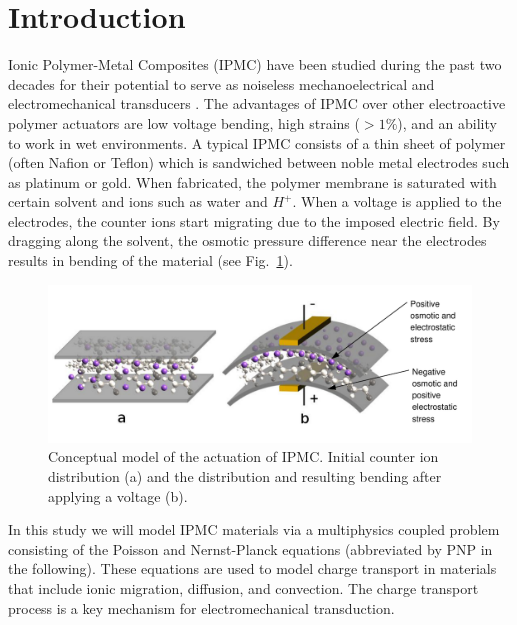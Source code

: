 \section{Introduction}

Ionic Polymer-Metal Composites (IPMC) have been studied during the past two 
decades for their potential to serve as noiseless mechanoelectrical and electromechanical 
transducers \cite{basu1997membrane,shahinpoor2001smartmat,
nasser2002applied,newbury2003intelligent, wallmersperger2007appliedphysics,
pugal2008appliedphysics,pugal2010polymer}.
The advantages of IPMC over other electroactive polymer actuators
are low voltage bending, high strains ($>1\%$), and an ability to work
in wet environments. A typical IPMC consists of a thin sheet of polymer
(often Nafion or Teflon) which is sandwiched between noble
metal electrodes such as platinum or gold. When fabricated, the polymer 
membrane is saturated with certain solvent and ions such as water and $H^+$.
When a voltage is applied to the electrodes, the counter ions start
migrating due to the imposed electric field. By dragging along the solvent,
the osmotic pressure difference near the electrodes
results in bending of the material (see Fig.~\ref{fig:conceptual}).
\begin{figure}[!ht]
  \begin{centering}
  \includegraphics[scale=0.7]{IPMC_bending}
  \caption{\label{fig:conceptual}Conceptual model of the actuation
 	of IPMC. Initial counter ion distribution (a) and
	the distribution and resulting bending after applying a voltage (b).}
  \end{centering}
\end{figure}

In this study we will model IPMC materials via a multiphysics coupled problem 
consisting of the Poisson and Nernst-Planck equations (abbreviated by PNP in
the following). These equations are used to model charge transport in materials 
that include ionic migration, diffusion, and convection. The charge transport 
process is a key mechanism for electromechanical transduction.

